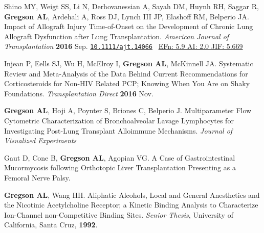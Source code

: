 \documentclass[letterpaper,11pt,sans,final]{/usr/local/share/texmf-dist/tex/latex/moderncv/moderncv}%
\begin{document}
 \vspace{0.2cm}
 \renewcommand{\refname}{Publications---Research Papers---Peer Reviewed ({\smaller in press})}
 \begin{thebibliography}{1}

\bibitem[1]{} Shino MY, Weigt SS, Li N, Derhovanessian A, Sayah DM, Huynh RH, Saggar R, \textbf{Gregson AL}, Ardehali A, Ross DJ, Lynch III JP, Elashoff RM, Belperio JA. Impact of Allograft Injury Time-of-Onset on the Development of Chronic Lung Allograft Dysfunction after Lung Transplantation. {\color{BrickRed}\textit{American Journal of Transplantation}} \textbf{2016} Sep. \href{http://onlinelibrary.wiley.com/doi/10.1111/ajt.14066/abstract}{\nolinkurl{10.1111/ajt.14066}}~
    {\color{NavyBlue}\href{http://52.6.43.8/projects/journalRank/rankings.php?bsearch=AMERICAN+JOURNAL+OF+TRANSPLANTATION&searchby=journal&orderby=eigenfactor}{{\smaller EFn: 5.9 AI: 2.0 JIF: 5.669}} 
       }

\bibitem[2]{} Injean P, Eells SJ, Wu H, McElroy I, \textbf{Gregson AL}, McKinnell JA. Systematic Review and Meta-Analysis of the Data Behind Current Recommendations for Corticosteroids for Non-HIV Related PCP; Knowing When You Are on Shaky Foundations. {\color{BrickRed}\textit{Transplantation Direct}} \textbf{2016} Nov.

 \end{thebibliography}

\vspace{0.2cm}
\renewcommand{\refname}{Publications---Research Papers---Peer Reviewed ({\smaller Submitted})}
\begin{thebibliography}{1}
  \bibitem[1]{} \textbf{Gregson AL}, Hoji A, Poynter S, Briones C, Belperio J. Multiparameter Flow Cytometric Characterization of Bronchoalveolar Lavage Lymphocytes for Investigating Post-Lung Transplant Alloimmune Mechanisms. {\color{BrickRed}\textit{Journal of Visualized Experiments}}

  \bibitem[2]{} Gaut D, Cone B, \textbf{Gregson AL}, Agopian VG. A Case of Gastrointestinal Mucormycosis following Orthotopic Liver Transplantation Presenting as a Femoral Nerve Palsy.

\end{thebibliography}

\vspace{0.2cm}
\renewcommand{\refname}{Publications---Research Papers---non-Peer Reviewed}
\begin{thebibliography}{1}
 \bibitem[1]{} \textbf{Gregson AL}, Wang HH. Aliphatic Alcohols, Local and General Anesthetics and the Nicotinic Acetylcholine Receptor; a Kinetic Binding Analysis to Characterize Ion-Channel non-Competitive Binding Sites. \textit{Senior Thesis}, University of California, Santa Cruz, \textbf{1992}.
\end{thebibliography}
\end{document}
